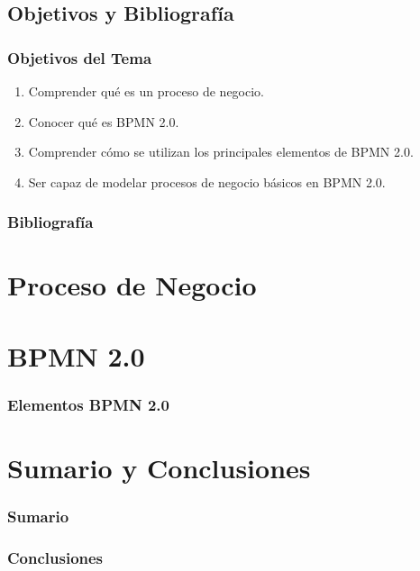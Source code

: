 \documentclass[a4paper,slidestop,xcolor=pst,blue]{beamer}
\begin{document}
\subsection{Objetivos y Bibliografía}

\begin{frame}[c]
    \frametitle{Objetivos del Tema}
    \begin{enumerate}[<+->]
         \item Comprender qué es un proceso de negocio.
         \item Conocer qué es BPMN 2.0.
         \item Comprender cómo se utilizan los principales elementos de BPMN 2.0.
         \item Ser capaz de modelar procesos de negocio básicos en BPMN 2.0.
    \end{enumerate}
\end{frame}

\begin{frame}[c]
    \frametitle{Bibliografía}
    \begin{thebibliography}{1}
        
        
    
    \end{thebibliography}
\end{frame}

\section{Proceso de Negocio}


\section{BPMN 2.0}


\begin{frame}[c]
    \frametitle{Elementos BPMN 2.0}
\end{frame}



\section{Sumario y Conclusiones}

\begin{frame}[c]
    \frametitle{Sumario}
\end{frame}

\begin{frame}[c]
    \frametitle{Conclusiones}
\end{frame}
\end{document}

